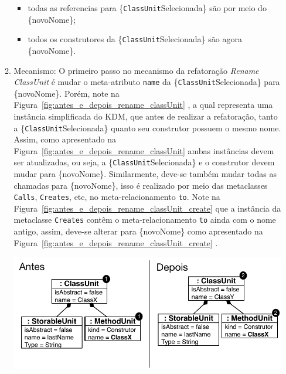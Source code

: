\begin{enumerate}
\begin{enumerate}
\begin{itemize}
			        \item todas as referencias para \{\texttt{ClassUnit}Selecionada\} são por meio do \{novoNome\};
			        \item todos os construtores da \{\texttt{ClassUnit}Selecionada\} são agora \{novoNome\}.
			    \end{itemize}
			\item Mecanismo: O primeiro passo no mecanismo da refatoração \textit{Rename ClassUnit} é mudar o meta-atributo \texttt{name} da \{\texttt{ClassUnit}Selecionada\} para \{novoNome\}. Porém, note na Figura~\ref{fig:antes_e_depois_rename_classUnit} , a qual representa uma instância simplificada do KDM, que antes de realizar a refatoração, tanto a \{\texttt{ClassUnit}Selecionada\} quanto seu construtor possuem o mesmo nome. Assim, como apresentado na Figura~\ref{fig:antes_e_depois_rename_classUnit}  ambas instâncias devem ser atualizadas, ou seja, a \{\texttt{ClassUnit}Selecionada\} e o construtor devem mudar para \{novoNome\}. Similarmente, deve-se também mudar todas as chamadas para \{novoNome\}, isso é realizado por meio das metaclasses \texttt{Calls}, \texttt{Creates}, etc, no meta-relacionamento \texttt{to}. Note na Figura~\ref{fig:antes_e_depois_rename_classUnit_create}  que a instância da metaclasse \texttt{Creates} contêm o meta-relacionamento \texttt{to} ainda com o nome antigo, assim, deve-se alterar para \{novoNome\} como apresentado na Figura~\ref{fig:antes_e_depois_rename_classUnit_create} .
			\begin{minipage}{.90\textwidth}
	\vspace*{\fill}
  \centering
	\includegraphics[scale=0.6]{images/antes_e_depois_rename_classUnit.pdf}
	\fautor
	\label{fig:antes_e_depois_rename_classUnit}

\end{minipage}
\end{enumerate}
\end{enumerate}

